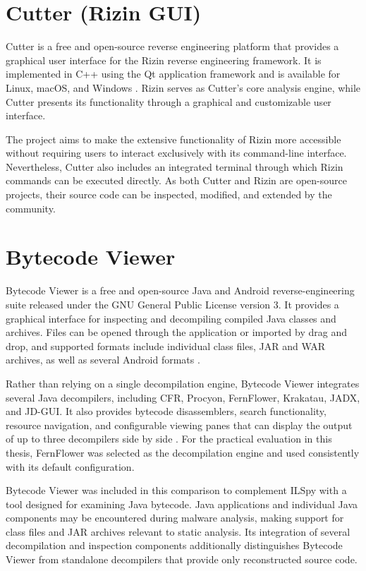\section{Cutter (Rizin GUI)}
\label{sec:tools:cutter}
Cutter is a free and open-source reverse engineering platform that provides a graphical user interface for the Rizin reverse engineering framework. 
It is implemented in C++ using the Qt application framework and is available for Linux, macOS, and Windows \cite{bib:cutter}. Rizin serves as Cutter's core analysis engine, 
while Cutter presents its functionality through a graphical and customizable user interface.

The project aims to make the extensive functionality of Rizin more accessible without requiring users to interact exclusively with its command-line interface. Nevertheless, 
Cutter also includes an integrated terminal through which Rizin commands can be executed directly. As both Cutter and Rizin are open-source projects, their source code can be inspected, 
modified, and extended by the community.

\section{Bytecode Viewer}
\label{sec:tools:bytecode-viewer}
Bytecode Viewer is a free and open-source Java and Android reverse-engineering suite released under the GNU General Public License version 3. It provides a graphical interface 
for inspecting and decompiling compiled Java classes and archives. Files can be opened through the application or imported by drag and drop, and supported formats include individual 
class files, JAR and WAR archives, as well as several Android formats \cite{bib:bytecode_viewer_github}.

Rather than relying on a single decompilation engine, Bytecode Viewer integrates several Java decompilers, including CFR, Procyon, FernFlower, Krakatau, JADX, and JD-GUI. 
It also provides bytecode disassemblers, search functionality, resource navigation, and configurable viewing panes that can display the output of up to three decompilers side 
by side \cite{bib:bytecode_viewer_github}. For the practical evaluation in this thesis, FernFlower was selected as the decompilation engine and used consistently with its default configuration.

Bytecode Viewer was included in this comparison to complement ILSpy with a tool designed for examining Java bytecode. Java applications and individual Java components may be 
encountered during malware analysis, making support for class files and JAR archives relevant to static analysis. Its integration of several decompilation and inspection components 
additionally distinguishes Bytecode Viewer from standalone decompilers that provide only reconstructed source code.

